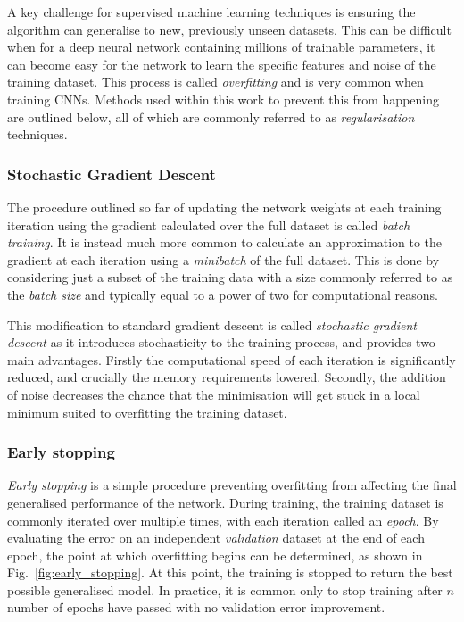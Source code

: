 A key challenge for supervised machine learning techniques is ensuring the algorithm can
generalise to new, previously unseen datasets. This can be difficult when for a deep neural
network containing millions of trainable parameters, it can become easy for the network to learn
the specific features and noise of the training dataset. This process is called \emph{overfitting}
and is very common when training CNNs. Methods used within this work to prevent this from
happening are outlined below, all of which are commonly referred to as \emph{regularisation}
techniques.

\subsubsection*{Stochastic Gradient Descent} %

The procedure outlined so far of updating the network weights at each training iteration using the
gradient calculated over the full dataset is called \emph{batch training}. It is instead much more
common to calculate an approximation to the gradient at each iteration using a \emph{minibatch} of
the full dataset. This is done by considering just a subset of the training data with a size
commonly referred to as the \emph{batch size} and typically equal to a power of two for
computational reasons.

This modification to standard gradient descent is called \emph{stochastic gradient descent} as it
introduces stochasticity to the training process, and provides two main advantages. Firstly the
computational speed of each iteration is significantly reduced, and crucially the memory
requirements lowered. Secondly, the addition of noise decreases the chance that the minimisation
will get stuck in a local minimum suited to overfitting the training dataset.

\subsubsection*{Early stopping} %

\emph{Early stopping} is a simple procedure preventing overfitting from affecting the final
generalised performance of the network. During training, the training dataset is commonly iterated
over multiple times, with each iteration called an \emph{epoch}. By evaluating the error on an
independent \emph{validation} dataset at the end of each epoch, the point at which overfitting
begins can be determined, as shown in Fig.~\ref{fig:early_stopping}. At this point, the training
is stopped to return the best possible generalised model. In practice, it is common only to stop
training after $n$ number of epochs have passed with no validation error improvement.

